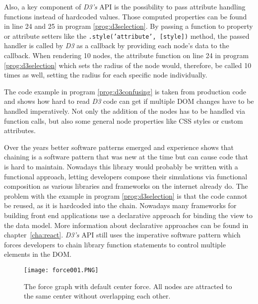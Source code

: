 Also, a key component of \emph{D3's} API is the possibility to pass attribute handling functions instead of hardcoded values. Those computed properties can be found in line 24 and 25 in program \ref{prog:d3selection}. By passing a function to property or attribute setters like the \texttt{.style('attribute', [style])} method, the passed handler is called by \emph{D3} as a callback by providing each node's data to the callback. When rendering 10 nodes, the attribute function on line 24 in program \ref{prog:d3selection} which sets the radius of the node would, therefore, be called 10 times as well, setting the radius for each specific node individually.

The code example in program \ref{prog:d3confusing} is taken from production code and shows how hard to read \emph{D3} code can get if multiple DOM changes have to be handled imperatively. Not only the addition of the nodes has to be handled via function calls, but also some general node properties like CSS styles or custom attributes.

Over the years better software patterns emerged and experience shows that chaining is a software pattern that was new at the time but can cause code that is hard to maintain. Nowadays this library would probably be written with a functional approach, letting developers compose their simulations via functional composition as various libraries and frameworks on the internet already do. The problem with the example in program \ref{prog:d3selection} is that the code cannot be reused, as it is hardcoded into the chain. Nowadays many frameworks for building front end applications use a declarative approach for binding the view to the data model. More information about declarative approaches can be found in chapter~\ref{cha:react}. \emph{D3's} API still uses the imperative software pattern which forces developers to chain library function statements to control multiple elements in the DOM.



\begin{figure}
  \centering
  \texttt{[image: force001.PNG]}
  \caption{The force graph with default center force. All nodes are attracted to the same center without overlapping each other.}
  \label{fig:force001}
\end{figure}

